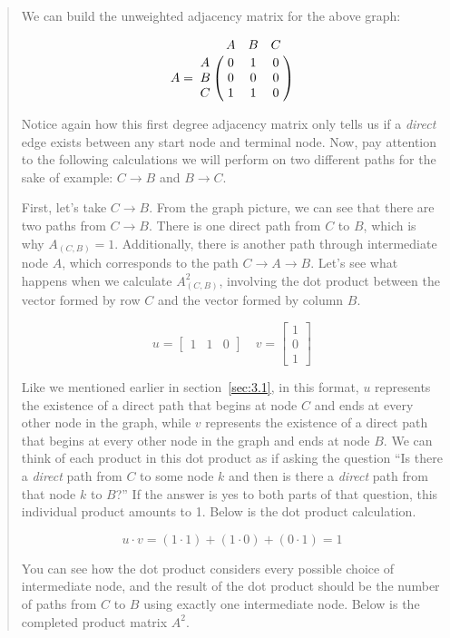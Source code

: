 \documentclass[12pt]{article}
\begin{document}
\begin{quote}
    We can build the unweighted adjacency matrix for the above graph:

    \[
        A =
        \bordermatrix{
            & A & B & C \cr
            A & 0 & 1 & 0 \cr
            B & 0 & 0 & 0 \cr
            C & 1 & 1 & 0 \cr
        }
    \]

    Notice again how this first degree adjacency matrix only tells us if a \emph{direct} edge exists between any start node and terminal node. Now, pay attention to the following calculations we will perform on two different paths for the sake of example: $C \to B$ and $B \to C$.

    First, let's take $C \to B$. From the graph picture, we can see that there are two paths from $C \to B$. There is one direct path from $C$ to $B$, which is why $A_{(C, B)} = 1$. Additionally, there is another path through intermediate node $A$, which corresponds to the path $C \to A \to B$. Let's see what happens when we calculate $A^2_{(C, B)}$, involving the dot product between the vector formed by row $C$ and the vector formed by column $B$.

    \[
        u =
        \begin{bmatrix}
            1 & 1 & 0
        \end{bmatrix}
        \quad
        v =
        \begin{bmatrix}
            1 \\
            0 \\
            1
        \end{bmatrix}
    \]

    Like we mentioned earlier in section~\ref{sec:3.1}, in this format, $u$ represents the existence of a direct path that begins at node $C$ and ends at every other node in the graph, while $v$ represents the existence of a direct path that begins at every other node in the graph and ends at node $B$. We can think of each product in this dot product as if asking the question ``Is there a \emph{direct} path from $C$ to some node $k$ and then is there a \emph{direct} path from that node $k$ to $B$?'' If the answer is yes to both parts of that question, this individual product amounts to 1. Below is the dot product calculation.

    \[
        u \cdot v = (1 \cdot 1) + (1 \cdot 0) + (0 \cdot 1) = 1
    \]

    You can see how the dot product considers every possible choice of intermediate node, and the result of the dot product should be the number of paths from $C$ to $B$ using exactly one intermediate node. Below is the completed product matrix $A^2$.


\end{quote}
\end{document}
